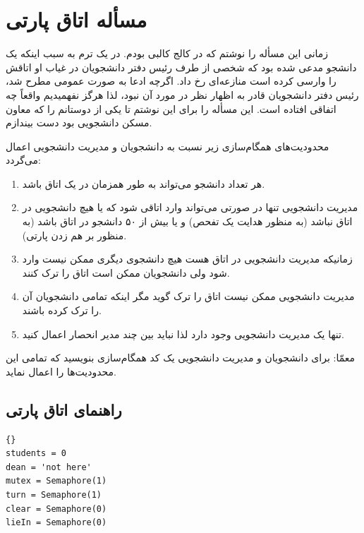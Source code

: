 \documentclass{book}
\newcommand{\clearemptydoublepage}{\newpage\cleardoublepage}
\begin{document}

\newpage
\section{مسأله اتاق پارتی}

    زمانی این مسأله را نوشتم که در کالج کالبی بودم. در یک ترم  به سبب اینکه یک دانشجو مدعی شده بود که شخصی از طرف رئیس دفتر دانشجویان 
    در غیاب او اتاقش را وارسی کرده است منازعه‌ای رخ داد. اگرچه ادعا به صورت عمومی مطرح شد، رئیس دفتر دانشجویان قادر به اظهار نظر در مورد آن نبود، 
    لذا هرگز نفهمیدیم واقعاً چه اتفاقی افتاده است. این مسأله را برای این نوشتم تا یکی از دوستانم را که معاون مسکن دانشجویی بود دست بیندازم. 

    محدودیت‌های همگام‌سازی زیر نسبت به دانشجویان و مدیریت دانشجویی اعمال می‌گردد: 

\begin{enumerate}

\item
    هر تعداد دانشجو می‌تواند به طور همزمان در یک اتاق باشد.

\item 
    مدیریت دانشجویی تنها  در صورتی می‌تواند وارد اتاقی شود که یا هیچ دانشجویی در اتاق نباشد (به منظور هدایت یک تفحص) و 
    یا بیش از ۵۰ دانشجو در اتاق باشد  (به منظور بر هم زدن پارتی).

\item 
    زمانیکه مدیریت دانشجویی در اتاق هست هیچ دانشجوی دیگری ممکن نیست وارد شود ولی دانشجویان ممکن است اتاق را ترک کنند. 

\item 
    مدیریت دانشجویی ممکن نیست اتاق را ترک گوید مگر اینکه تمامی دانشجویان آن را ترک کرده باشند. 

\item 
    تنها یک مدیریت دانشجویی وجود دارد لذا نباید بین چند مدیر انحصار اعمال کنید. 

\end{enumerate}

    معمّا: برای دانشجویان و مدیریت دانشجویی یک کد همگام‌سازی بنویسید که تمامی این محدودیت‌ها را اعمال نماید. 


\clearemptydoublepage
\subsection{راهنمای اتاق پارتی}

\begin{latin}
\begin{lstlisting}[title=\rl{راهنمای اتاق پارتی}]{}
students = 0                
dean = 'not here'           
mutex = Semaphore(1)
turn = Semaphore(1)
clear = Semaphore(0)
lieIn = Semaphore(0)
\end{lstlisting}
\end{latin}
\end{document}
